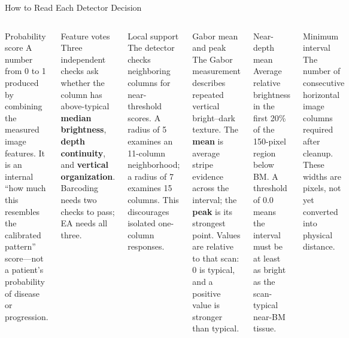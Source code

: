 \documentclass[aspectratio=169]{beamer}
\begin{document}
\begin{frame}{How to Read Each Detector Decision}

\scriptsize
\begin{columns}[T]
\begin{block}{Probability score}
A number from 0 to 1 produced by combining the measured image features. It is
an internal ``how much this resembles the calibrated pattern'' score---not a
patient's probability of disease or progression.
\end{block}
\vspace{-0.08cm}

\begin{block}{Feature votes}
Three independent checks ask whether the column has above-typical
\textbf{median brightness}, \textbf{depth continuity}, and
\textbf{vertical organization}. Barcoding needs two checks to pass; EA needs
all three.
\end{block}
\vspace{-0.08cm}

\begin{block}{Local support}
The detector checks neighboring columns for near-threshold scores. A radius of
5 examines an 11-column neighborhood; a radius of 7 examines 15 columns. This
discourages isolated one-column responses.
\end{block}

\begin{block}{Gabor mean and peak}
The Gabor measurement describes repeated vertical bright--dark texture. The
\textbf{mean} is average stripe evidence across the interval; the
\textbf{peak} is its strongest point. Values are relative to that scan: 0 is
typical, and a positive value is stronger than typical.
\end{block}
\vspace{-0.08cm}

\begin{block}{Near-depth mean}
Average relative brightness in the first 20\% of the 150-pixel region below
BM. A threshold of 0.0 means the interval must be at least as bright as the
scan-typical near-BM tissue.
\end{block}
\vspace{-0.08cm}

\begin{block}{Minimum interval}
The number of consecutive horizontal image columns required after cleanup.
These widths are pixels, not yet converted into physical distance.
\end{block}
\end{columns}

\end{frame}
\end{document}

